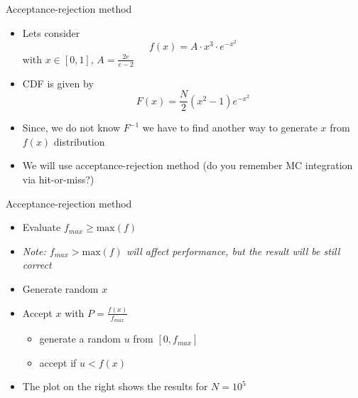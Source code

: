 \begin{slide}[toc=Acceptance-rejection]{Acceptance-rejection method}
\null\vfill

  \twocolumn
  {
    \begin{itemize}
      \item Lets consider
      $$f(x) = A \cdot x^3 \cdot e^{-x^2}$$
      with $x \in [0, 1]$, $A = \frac{2e}{e-2}$ 
      \item CDF is given by
      $$F(x) = \frac{N}{2}(x^2 - 1)e^{-x^2}$$
    \end{itemize}
  }
  {
    
  }
  
  \begin{itemize}
    \item Since, we do not know $F^{-1}$ we have to find another way to generate $x$ from $f(x)$ distribution
    \item We will use acceptance-rejection method (do you remember MC integration via hit-or-miss?)
  \end{itemize}

\vfill\null
\end{slide}

\begin{slide}[toc=]{Acceptance-rejection method}
\null\vfill

  \twocolumn
  {
    \begin{itemize}
      \item Evaluate $f_{max} \geq \mbox{max}(f)$
      \item[] {\it\color{pdcolor3}Note: $f_{max} > \mbox{max}(f)$ will affect performance, but the result will be still correct}
      \item Generate random $x$
      \item Accept $x$ with $P = \frac{f(x)}{f_{max}}$
      \begin{itemize}
	\item generate a random $u$ from $[0, f_{max}]$
	\item accept if $u < f(x)$
      \end{itemize}
      \item The plot on the right shows the results for $N = 10^5$
    \end{itemize}
  }
  {
    
    
  }

\vfill\null
\end{slide}

